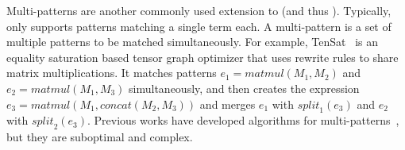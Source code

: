 
\def\matmul{\mathit{matmul}}
\def\split{\mathit{split}}
\def\concat{\mathit{concat}} 
Multi-patterns are another commonly used extension to \ematching (and thus \eqsat).
Typically, \ematching only supports patterns matching a single term each.
A multi-pattern is a set of multiple patterns to be matched simultaneously.
For example, TenSat~\citep{tensat} is 
 an equality saturation based tensor graph optimizer
 that uses rewrite rules to share matrix multiplications.
It matches patterns $e_1 = \matmul(M_1,M_2)$ and $e_2 = \matmul(M_1,M_3)$ 
 simultaneously, 
 and then creates the expression $e_3 = \matmul(M_1,\concat(M_2,M_3))$
 and merges $e_1$ with $\split_1(e_3)$ and $e_2$ with $\split_2(e_3)$.
Previous works have developed algorithms for multi-patterns~\citep{tensat, ematching},
 but they are suboptimal and complex.

